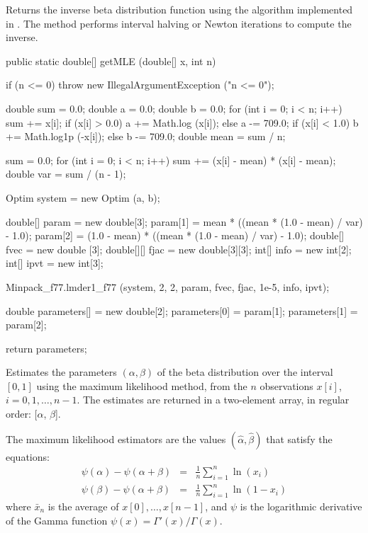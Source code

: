 \begin{tabb}   Returns the inverse beta distribution function
  using the algorithm implemented in
  .
   The method performs interval halving or Newton iterations to
   compute the inverse.
\end{tabb}
\begin{code}

   public static double[] getMLE (double[] x, int n)\begin{hide} {
      if (n <= 0)
         throw new IllegalArgumentException ("n <= 0");

      double sum = 0.0;
      double a = 0.0;
      double b = 0.0;
      for (int i = 0; i < n; i++)
      {
         sum += x[i];
         if (x[i] > 0.0)
            a += Math.log (x[i]);
         else
            a -= 709.0;
         if (x[i] < 1.0)
            b += Math.log1p (-x[i]);
         else
            b -= 709.0;
      }
      double mean = sum / n;

      sum = 0.0;
      for (int i = 0; i < n; i++)
         sum += (x[i] - mean) * (x[i] - mean);
      double var = sum / (n - 1);

      Optim system = new Optim (a, b);

      double[] param = new double[3];
      param[1] = mean * ((mean * (1.0 - mean) / var) - 1.0);
      param[2] = (1.0 - mean) * ((mean * (1.0 - mean) / var) - 1.0);
      double[] fvec = new double [3];
      double[][] fjac = new double[3][3];
      int[] info = new int[2];
      int[] ipvt = new int[3];

      Minpack_f77.lmder1_f77 (system, 2, 2, param, fvec, fjac, 1e-5, info, ipvt);

      double parameters[] = new double[2];
      parameters[0] = param[1];
      parameters[1] = param[2];

      return parameters;
   }\end{hide}
\end{code}
\begin{tabb}
   Estimates the parameters $(\alpha,\beta)$ of the beta distribution over the
  interval $[0,1]$ using the maximum likelihood method, from the $n$ observations
   $x[i]$, $i = 0, 1,\ldots, n-1$. The estimates are returned in a two-element
    array, in regular order: [$\alpha$, $\beta$].
   \begin{detailed}
   The maximum likelihood estimators are the values $(\hat\alpha, \hat\beta)$
   that satisfy the equations:
   \begin{eqnarray*}
      \psi(\alpha) - \psi(\alpha + \beta) & = & \frac1n \sum_{i=1}^{n} \ln(x_i)\\
      \psi(\beta) - \psi(\alpha + \beta) & = & \frac1n \sum_{i=1}^{n} \ln(1 - x_i)
   \end{eqnarray*}
   where $\bar x_n$ is the average of $x[0],\dots,x[n-1]$, and
   $\psi$ is the logarithmic derivative of the Gamma function
   $\psi(x) = \Gamma'(x) / \Gamma(x)$.
   \end{detailed}
\end{tabb}
